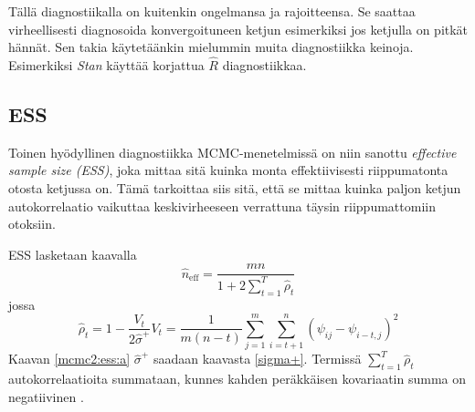 Tällä diagnostiikalla on kuitenkin ongelmansa ja rajoitteensa. Se saattaa virheellisesti diagnosoida konvergoituneen ketjun esimerkiksi jos ketjulla on pitkät hännät. Sen takia käytetäänkin mielummin muita diagnostiikka keinoja. Esimerkiksi \textit{Stan} käyttää korjattua $\hat{R}$ diagnostiikkaa. \cite{vehtari_2019}

\subsection{ESS}

Toinen hyödyllinen diagnostiikka MCMC-menetelmissä on niin sanottu \textit{effective sample size (ESS)}, joka mittaa sitä kuinka monta effektiivisesti riippumatonta otosta ketjussa on. Tämä tarkoittaa siis sitä, että se mittaa kuinka paljon ketjun autokorrelaatio vaikuttaa keskivirheeseen verrattuna täysin riippumattomiin otoksiin.
\begin{maar}
	ESS lasketaan kaavalla
	\begin{equation}
		\hat{n}_{\mathrm{eff}} = \frac{mn}{1+2\sum_{t=1}^{T}\hat{\rho}_t}
	\end{equation}
	jossa 
	\begin{subequations}
	\begin{equation}\label{mcmc2:ess:a}
		\hat{\rho}_t = 1 - \frac{V_t}{2\hat{\sigma}^+}
	\end{equation}
	\begin{equation}
		V_t=\frac{1}{m(n-t)}\sum_{j=1}^{m}\sum_{i=t+1}^{n}(\psi_{ij}-\psi_{i-t,j})^2
	\end{equation}
	\end{subequations}
	Kaavan \eqref{mcmc2:ess:a} $\hat{\sigma}^+$ saadaan kaavasta \eqref{sigma+}. Termissä $\sum_{t=1}^{T}\hat{\rho}_t$ autokorrelaatioita summataan, kunnes kahden peräkkäisen kovariaatin summa on negatiivinen \cite{geyer_practical_1992}.
\end{maar}















